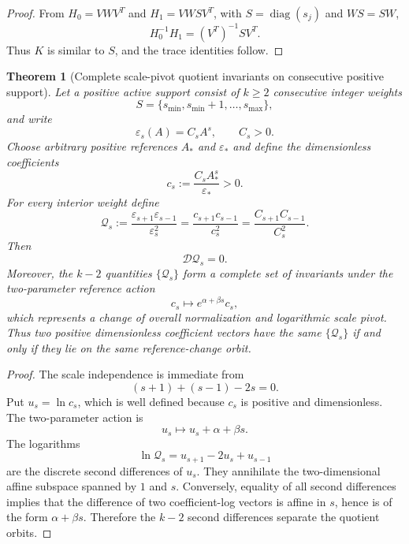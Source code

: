 \documentclass[aps,prd,reprint,onecolumn,nofootinbib,superscriptaddress,showkeys]{revtex4-2}
\numberwithin{equation}{section}
\theoremstyle{definition}
\theoremstyle{plain}
\newtheorem{theorem}{Theorem}[section]
\newcommand{\Dil}{\mathscr D}
\newcommand{\diag}{\operatorname{diag}}
\begin{document}
\begin{proof}
From $H_0=VWV^T$ and $H_1=VWSV^T$, with $S=\diag(s_j)$ and $WS=SW$,
\[
H_0^{-1}H_1=(V^T)^{-1}SV^T.
\]
Thus $K$ is similar to $S$, and the trace identities follow.
\end{proof}

\begin{theorem}[Complete scale-pivot quotient invariants on consecutive positive support]\label{thm:crossratio}
Let a positive active support consist of $k\ge2$ consecutive integer weights
\[
S=\{s_{\min},s_{\min}+1,\ldots,s_{\max}\},
\]
and write
\[
\varepsilon_s(A)=C_sA^s,\qquad C_s>0.
\]
Choose arbitrary positive references $A_*$ and $\varepsilon_*$ and define the dimensionless coefficients
\begin{equation}
 c_s:=\frac{C_sA_*^s}{\varepsilon_*}>0.
\end{equation}
For every interior weight define
\begin{equation}
\boxed{
\mathcal Q_s
:=
\frac{\varepsilon_{s+1}\varepsilon_{s-1}}{\varepsilon_s^2}
=
\frac{c_{s+1}c_{s-1}}{c_s^2}
=
\frac{C_{s+1}C_{s-1}}{C_s^2}.
}
\end{equation}
Then
\begin{equation}
\Dil\mathcal Q_s=0.
\end{equation}
Moreover, the $k-2$ quantities $\{\mathcal Q_s\}$ form a complete set of invariants under the two-parameter reference action
\begin{equation}
 c_s\longmapsto e^{\alpha+\beta s}c_s,
\end{equation}
which represents a change of overall normalization and logarithmic scale pivot.  Thus two positive dimensionless coefficient vectors have the same $\{\mathcal Q_s\}$ if and only if they lie on the same reference-change orbit.
\end{theorem}

\begin{proof}
The scale independence is immediate from
\[
(s+1)+(s-1)-2s=0.
\]
Put $u_s=\ln c_s$, which is well defined because $c_s$ is positive and dimensionless.  The two-parameter action is
\[
u_s\longmapsto u_s+\alpha+\beta s.
\]
The logarithms
\[
\ln\mathcal Q_s=u_{s+1}-2u_s+u_{s-1}
\]
are the discrete second differences of $u_s$.  They annihilate the two-dimensional affine subspace spanned by $1$ and $s$.  Conversely, equality of all second differences implies that the difference of two coefficient-log vectors is affine in $s$, hence is of the form $\alpha+\beta s$.  Therefore the $k-2$ second differences separate the quotient orbits.
\end{proof}
\end{document}
